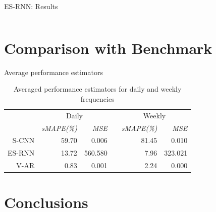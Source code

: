 \documentclass[aspectratio=169, 12pt]{beamer}
\newcommand{\ra}[1]{\renewcommand{\arraystretch}{#1}}
\begin{document}
\begin{frame}[allowframebreaks]{ES-RNN: Results}
\begin{columns}
\begin{column}{0.25\textwidth}
    \end{column}
\end{columns}
\end{frame}

\section{Comparison with Benchmark}

\begin{frame}{Average performance estimators}
\begin{table}\centering
\ra{1.3}
\caption{Averaged performance estimators for daily and weekly frequencies}\label{tab:res}
\begin{tabular}{@{}rrrcrr@{}}\toprule
& \multicolumn{2}{c}{Daily} & \phantom{abc}& \multicolumn{2}{c}{Weekly}\\
\cmidrule{2-3} \cmidrule{4-6}
& \textit{sMAPE(\%)} & \textit{MSE} && \textit{sMAPE(\%)} & \textit{MSE} \\
\midrule
S-CNN & 59.70  & 0.006 && 81.45 & 0.010 \\
ES-RNN & 13.72 & 560.580 && 7.96 & 323.021\\
V-AR & 0.83 & 0.001 && 2.24 & 0.000\\
\bottomrule
\end{tabular}
\end{table}
\end{frame}

\section{Conclusions}
\end{document}
